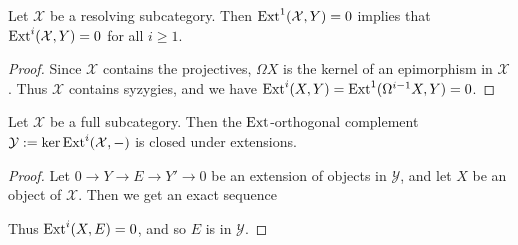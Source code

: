 \begin{lemma}\label{lem:resolving_ext_vanish}
	Let $\mathcal X$ be a resolving subcategory. Then $\operatorname{Ext}^1(\mathcal X, Y) = 0$ implies that $\operatorname{Ext}^i(\mathcal X, Y)=0$ for all $i \geq 1$.
	\begin{proof}
		Since $\mathcal X$ contains the projectives, $\Omega X$ is the kernel of an epimorphism in $\mathcal X$. Thus $\mathcal X$ contains syzygies, and we have $\operatorname{Ext}^i(X, Y) = \operatorname{Ext}^1(\Omega^{i-1}X, Y) = 0$.
	\end{proof}
\end{lemma}

\begin{prop}\label{prop:complement_closed_under_extension}
	Let $\mathcal X$ be a full subcategory. Then the $\operatorname{Ext}$-orthogonal complement $\mathcal Y := \ker\operatorname{Ext}^{i}(\mathcal X, -)$ is closed under extensions.
	\begin{proof}
		Let $0 \to Y \to E \to Y' \to 0$ be an extension of objects in $\mathcal Y$, and let $X$ be an object of $\mathcal X$. Then we get an exact sequence  
		\begin{center}
		\end{center}
		Thus $\operatorname{Ext}^i(X, E)=0$, and so $E$ is in $\mathcal Y$.
	\end{proof}
\end{prop}

